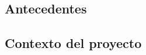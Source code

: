 \documentclass[../../main.tex]{subfiles}
\begin{document}
\lipsum[1]

\subsection{Antecedentes}\label{subsec:antecedentes}


\subsection{Contexto del proyecto}\label{subsec:contexto}

\end{document}
